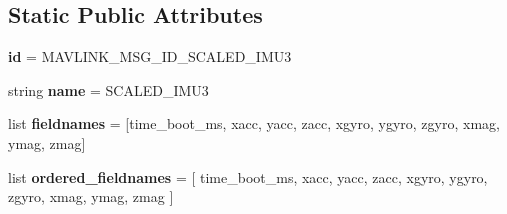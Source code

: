 \subsection*{Static Public Attributes}
\begin{DoxyCompactItemize}
\item 
\mbox{\label{classpymavlink_1_1dialects_1_1v10_1_1MAVLink__scaled__imu3__message_aeb485b5187223b4a83143f4ccb22f605}} 
{\bfseries id} = M\+A\+V\+L\+I\+N\+K\+\_\+\+M\+S\+G\+\_\+\+I\+D\+\_\+\+S\+C\+A\+L\+E\+D\+\_\+\+I\+M\+U3
\item 
\mbox{\label{classpymavlink_1_1dialects_1_1v10_1_1MAVLink__scaled__imu3__message_a212c6be7c0196d12ae74339ba48c54ba}} 
string {\bfseries name} = \textquotesingle{}S\+C\+A\+L\+E\+D\+\_\+\+I\+M\+U3\textquotesingle{}
\item 
\mbox{\label{classpymavlink_1_1dialects_1_1v10_1_1MAVLink__scaled__imu3__message_a7c61a39c3c7934817f062374b2fbb03f}} 
list {\bfseries fieldnames} = \mbox{[}\textquotesingle{}time\+\_\+boot\+\_\+ms\textquotesingle{}, \textquotesingle{}xacc\textquotesingle{}, \textquotesingle{}yacc\textquotesingle{}, \textquotesingle{}zacc\textquotesingle{}, \textquotesingle{}xgyro\textquotesingle{}, \textquotesingle{}ygyro\textquotesingle{}, \textquotesingle{}zgyro\textquotesingle{}, \textquotesingle{}xmag\textquotesingle{}, \textquotesingle{}ymag\textquotesingle{}, \textquotesingle{}zmag\textquotesingle{}\mbox{]}
\item 
\mbox{\label{classpymavlink_1_1dialects_1_1v10_1_1MAVLink__scaled__imu3__message_a2514649cddd0a9ca6c52976dc7617718}} 
list {\bfseries ordered\+\_\+fieldnames} = \mbox{[} \textquotesingle{}time\+\_\+boot\+\_\+ms\textquotesingle{}, \textquotesingle{}xacc\textquotesingle{}, \textquotesingle{}yacc\textquotesingle{}, \textquotesingle{}zacc\textquotesingle{}, \textquotesingle{}xgyro\textquotesingle{}, \textquotesingle{}ygyro\textquotesingle{}, \textquotesingle{}zgyro\textquotesingle{}, \textquotesingle{}xmag\textquotesingle{}, \textquotesingle{}ymag\textquotesingle{}, \textquotesingle{}zmag\textquotesingle{} \mbox{]}
\item 

\end{DoxyCompactItemize}
